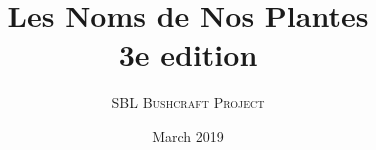 \documentclass[book,12pt,a4paper,onecolumn,openany]{memoir}
\title{%
  {\bfseries Les Noms de Nos Plantes}\\[.25em]
  {\Large 3e edition}}
\author{{\Large\scshape SBL Bushcraft Project}}
\date{March 2019}
\begin{document}
\begin{titlingpage}
\maketitle\vfill
\end{titlingpage}
\end{document}
